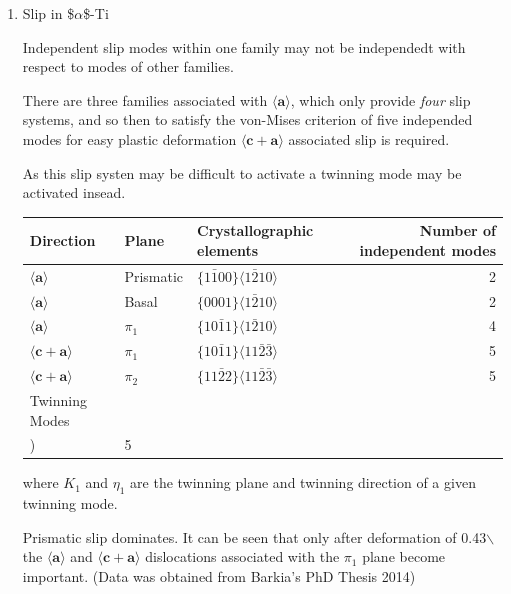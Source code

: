\documentclass[11pt]{article}
\begin{document}
\begin{enumerate}
\begin{enumerate}
\begin{enumerate}
\#\#\#\#\#\#\#\#\#\#\#\#\#\#\#\#\#\#\#\#

\item Slip in \$\(\alpha\)\$-Ti
\label{sec:orgd6981fb}

Independent slip modes within one family may not be independedt with respect to modes of other families. 

There are three families associated with \(\langle \mathbf{a} \rangle\), which only provide \emph{four} slip systems, and 
so then to satisfy the von-Mises criterion of five independed modes for easy plastic deformation
 \(\langle \mathbf{c} +  \mathbf{a}\rangle\) associated slip is required.

As this slip systen may be difficult to activate a twinning mode may be activated insead. 

\begin{center}
\begin{tabular}{lllr}
Direction & Plane & Crystallographic elements & Number of independent modes\\
\hline
\(\langle \mathbf{a} \rangle\) & Prismatic & \(\{1\bar{1}00\}  \langle 1\bar{2}10 \rangle\) & 2\\
\(\langle \mathbf{a} \rangle\) & Basal & \(\{0001\}        \langle 1\bar{2}10 \rangle\) & 2\\
\(\langle \mathbf{a} \rangle\) & \(\pi_1\) & \(\{10\bar{1}1\}  \langle 1\bar{2}10 \rangle\) & 4\\
\(\langle \mathbf{c} +  \mathbf{a}\rangle\) & \(\pi_1\) & \(\{10\bar{1}1\}  \langle 11\bar{2}\bar{3} \rangle\) & 5\\
\(\langle \mathbf{c} +  \mathbf{a}\rangle\) & \(\pi_2\) & \(\{11\bar{2}2\}  \langle 11\bar{2}\bar{3} \rangle\) & 5\\
\hline
Twinning Modes &  & \(\{K_1\} \langle \eta_1 \rangle\\) & 5\\
\end{tabular}
\end{center}

where \(K_1\) and \(\eta_1\) are the twinning plane and twinning direction of a given twinning mode. 

Prismatic slip dominates. It can be seen that only after deformation of 0.43$\backslash$%
the \(\langle \mathbf{a} \rangle\) and \(\langle \mathbf{c} +  \mathbf{a}\rangle\) dislocations associated with the \(\pi_1\)
plane become important. (Data was obtained from Barkia's PhD Thesis 2014)


\end{enumerate}
\end{enumerate}
\end{enumerate}
\end{document}
